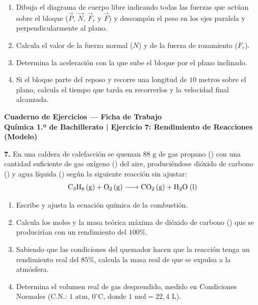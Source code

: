 \documentclass[11pt,a4paper]{article}
\begin{document}
\begin{enumerate}[label=\textbf{\alph*)}, leftmargin=2em, itemsep=7pt]
    \item Dibuja el diagrama de cuerpo libre indicando todas las fuerzas que actúan sobre el bloque ($\vec{P}$, $\vec{N}$, $\vec{F}_r$ y $\vec{F}$) y descompón el peso en los ejes paralela y perpendicularmente al plano.
    \item Calcula el valor de la fuerza normal ($N$) y de la fuerza de rozamiento ($F_r$).
    \item Determina la aceleración con la que sube el bloque por el plano inclinado.
    \item Si el bloque parte del reposo y recorre una longitud de $10\text{ metros}$ sobre el plano, calcula el tiempo que tarda en recorrerlos y la velocidad final alcanzada.
\end{enumerate}

\newpage

\begin{center}
    {\LARGE \textbf{Cuaderno de Ejercicios — Ficha de Trabajo}}\\[4pt]
    {\large \textbf{Química 1.º de Bachillerato | Ejercicio 7: Rendimiento de Reacciones (Modelo)}}
\end{center}

\vspace{0.8cm}
\noindent\textbf{7.} En una caldera de calefacción se queman $88\text{ g}$ de gas propano () con una cantidad suficiente de gas oxígeno () del aire, produciéndose dióxido de carbono () y agua líquida () según la siguiente reacción sin ajustar:
\[
\ce{C3H8 (g) + O2 (g) -> CO2 (g) + H2O (l)}
\]

\begin{enumerate}[label=\textbf{\alph*)}, leftmargin=2em, itemsep=12pt]
    \item Escribe y ajusta la ecuación química de la combustión.
    \item Calcula los moles y la masa teórica máxima de dióxido de carbono () que se producirían con un rendimiento del $100\%$.
    \item Sabiendo que las condiciones del quemador hacen que la reacción tenga un rendimiento real del $85\%$, calcula la masa real de  que se expulsa a la atmósfera.
    \item Determina el volumen real de gas  desprendido, medido en Condiciones Normales ($\text{C.N.}$: $1\text{ atm}$, $0^\circ\text{C}$, donde $1\text{ mol} = 22{,}4\text{ L}$).
\end{enumerate}
\end{document}
